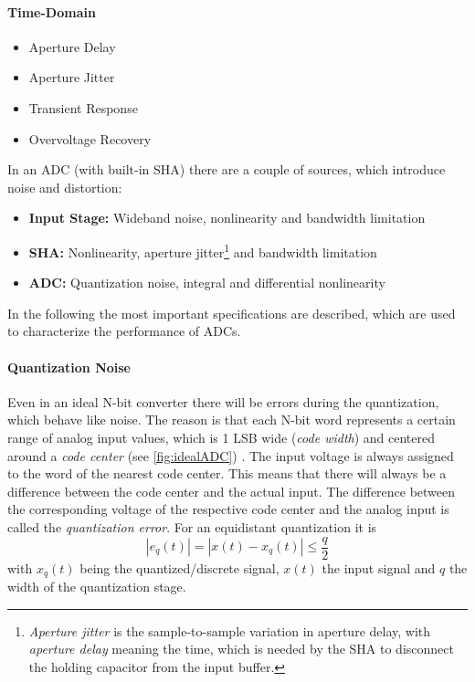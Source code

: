 \paragraph{Time-Domain}
\begin{itemize}
	\item Aperture Delay
	\item Aperture Jitter
	\item Transient Response
	\item Overvoltage Recovery
\end{itemize}


In an ADC (with built-in SHA) there are a couple of sources, which introduce noise and distortion:
\begin{itemize}
	\item \textbf{Input Stage:} Wideband noise, nonlinearity and bandwidth limitation
	\item \textbf{SHA:} Nonlinearity, aperture jitter\footnote{\textit{Aperture jitter} is the sample-to-sample variation in aperture delay, with \textit{aperture delay} meaning the time, which is needed by the SHA to disconnect the holding capacitor from the input buffer.} and bandwidth limitation
	\item \textbf{ADC:} Quantization noise, integral and differential nonlinearity
\end{itemize}
In the following the most important specifications are described, which are used to characterize the performance of ADCs.

\paragraph{Quantization Noise}
Even in an ideal N-bit converter there will be errors during the quantization, which behave like noise. The reason is that each N-bit word represents a certain range of analog input values, which is 1 LSB wide (\textit{code width}) and centered around a \textit{code center} (see \autoref{fig:idealADC}) \cite{Lundberg}. The input voltage is always assigned to the word of the nearest code center. This means that there will always be a difference between the code center and the actual input. The difference between the corresponding voltage of the respective code center and the analog input is called the \textit{quantization error}. For an equidistant quantization it is
\begin{equation}
	\left| e_q(t) \right| = \left| x(t) - x_q(t) \right| \leq \frac{q}{2}
\end{equation}
with $x_q(t)$ being the quantized/discrete signal, $x(t)$ the input signal and $q$ the width of the quantization stage. \cite{puente2015} 

